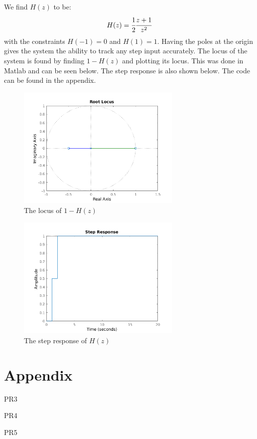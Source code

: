 \documentclass{article}
\begin{document}
We find $H(z)$ to be:
\[H(z)=\cfrac{1}{2}\cfrac{z+1}{z^2}\]
with the constraints $H(-1)=0$ and $H(1)=1$. Having the poles at the origin gives the system the ability to track any step input accurately. The locus of the system is found by finding $1-H(z)$ and plotting its locus. This was done in Matlab and can be seen below. The step response is also shown below. The code can be found in the appendix.
\begin{figure}[H]
    \centering
    \includegraphics[width=0.7\textwidth]{PR5_locus.png}
    \caption{The locus of $1-H(z)$}
\end{figure}
\begin{figure}[H]
    \centering
    \includegraphics[width=0.7\textwidth]{PR5_step.png}
    \caption{The step response of $H(z)$}
\end{figure}

\appendix
\section*{Appendix}
PR3

\vspace{1em}
PR4

\vspace{1em}
PR5

\end{document}
